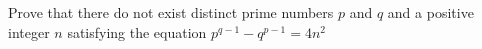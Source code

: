 Prove that there do not exist distinct prime numbers $p$ and $q$ and a positive integer $n$ satisfying the equation $p^{q-1}- q^{p-1}=4n^2$